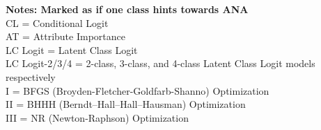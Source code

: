\begin{table}[H]
\vspace{1em}
\raggedright
\textbf{Notes: Marked as \tick if one class hints towards ANA} \\
CL = Conditional Logit \\
AT = Attribute Importance \\
LC Logit = Latent Class Logit \\
LC Logit-2/3/4 = 2-class, 3-class, and 4-class Latent Class Logit models respectively \\
I = BFGS (Broyden-Fletcher-Goldfarb-Shanno) Optimization \\
II = BHHH (Berndt–Hall–Hall–Hausman) Optimization \\
III = NR (Newton-Raphson) Optimization
\label{tab:model_comparison}
\end{table}
